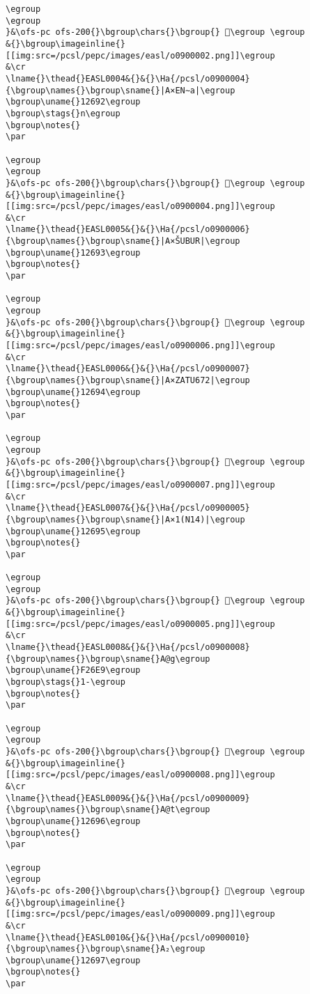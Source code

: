 \begin{verbatim}
\egroup
\egroup
}&\ofs-pc ofs-200{}\bgroup\chars{}\bgroup{} 󲱇\egroup \egroup
&{}\bgroup\imageinline{}[[img:src=/pcsl/pepc/images/easl/o0900002.png]]\egroup
&\cr
\lname{}\thead{}EASL0004&{}&{}\Ha{/pcsl/o0900004}{\bgroup\names{}\bgroup\sname{}|A×EN∼a|\egroup
\bgroup\uname{}12692\egroup
\bgroup\stags{}n\egroup
\bgroup\notes{}
\par 

\egroup
\egroup
}&\ofs-pc ofs-200{}\bgroup\chars{}\bgroup{} 𒚒\egroup \egroup
&{}\bgroup\imageinline{}[[img:src=/pcsl/pepc/images/easl/o0900004.png]]\egroup
&\cr
\lname{}\thead{}EASL0005&{}&{}\Ha{/pcsl/o0900006}{\bgroup\names{}\bgroup\sname{}|A×ŠUBUR|\egroup
\bgroup\uname{}12693\egroup
\bgroup\notes{}
\par 

\egroup
\egroup
}&\ofs-pc ofs-200{}\bgroup\chars{}\bgroup{} 𒚓\egroup \egroup
&{}\bgroup\imageinline{}[[img:src=/pcsl/pepc/images/easl/o0900006.png]]\egroup
&\cr
\lname{}\thead{}EASL0006&{}&{}\Ha{/pcsl/o0900007}{\bgroup\names{}\bgroup\sname{}|A×ZATU672|\egroup
\bgroup\uname{}12694\egroup
\bgroup\notes{}
\par 

\egroup
\egroup
}&\ofs-pc ofs-200{}\bgroup\chars{}\bgroup{} 𒚔\egroup \egroup
&{}\bgroup\imageinline{}[[img:src=/pcsl/pepc/images/easl/o0900007.png]]\egroup
&\cr
\lname{}\thead{}EASL0007&{}&{}\Ha{/pcsl/o0900005}{\bgroup\names{}\bgroup\sname{}|A×1(N14)|\egroup
\bgroup\uname{}12695\egroup
\bgroup\notes{}
\par 

\egroup
\egroup
}&\ofs-pc ofs-200{}\bgroup\chars{}\bgroup{} 𒚕\egroup \egroup
&{}\bgroup\imageinline{}[[img:src=/pcsl/pepc/images/easl/o0900005.png]]\egroup
&\cr
\lname{}\thead{}EASL0008&{}&{}\Ha{/pcsl/o0900008}{\bgroup\names{}\bgroup\sname{}A@g\egroup
\bgroup\uname{}F26E9\egroup
\bgroup\stags{}1-\egroup
\bgroup\notes{}
\par 

\egroup
\egroup
}&\ofs-pc ofs-200{}\bgroup\chars{}\bgroup{} 󲛩\egroup \egroup
&{}\bgroup\imageinline{}[[img:src=/pcsl/pepc/images/easl/o0900008.png]]\egroup
&\cr
\lname{}\thead{}EASL0009&{}&{}\Ha{/pcsl/o0900009}{\bgroup\names{}\bgroup\sname{}A@t\egroup
\bgroup\uname{}12696\egroup
\bgroup\notes{}
\par 

\egroup
\egroup
}&\ofs-pc ofs-200{}\bgroup\chars{}\bgroup{} 𒚖\egroup \egroup
&{}\bgroup\imageinline{}[[img:src=/pcsl/pepc/images/easl/o0900009.png]]\egroup
&\cr
\lname{}\thead{}EASL0010&{}&{}\Ha{/pcsl/o0900010}{\bgroup\names{}\bgroup\sname{}A₂\egroup
\bgroup\uname{}12697\egroup
\bgroup\notes{}
\par 


\end{verbatim}
